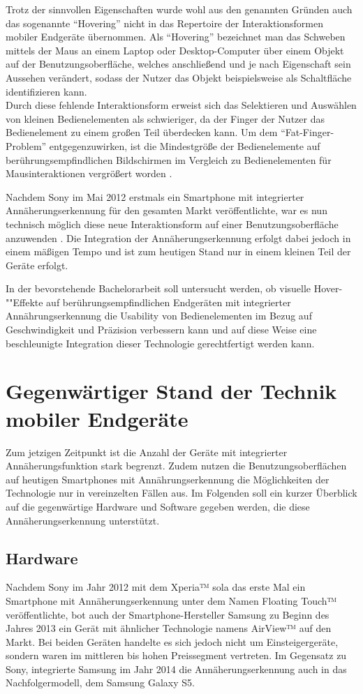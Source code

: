 \documentclass[a4paper,12pt,bibliography=totoc]{scrreprt}%
\begin{document}
Trotz der sinnvollen Eigenschaften wurde wohl aus den genannten Gründen auch das sogenannte "`Hovering"' nicht in das Repertoire der Interaktionsformen mobiler Endgeräte übernommen.
Als "`Hovering"' bezeichnet man das Schweben mittels der Maus an einem Laptop oder Desktop-Computer über einem Objekt auf der Benutzungsoberfläche, welches anschließend und je nach Eigenschaft sein Aussehen verändert, sodass der Nutzer das Objekt beispielsweise als Schaltfläche identifizieren kann.\\
Durch diese fehlende Interaktionsform erweist sich das Selektieren und Auswählen von kleinen Bedienelementen als schwieriger, da der Finger der Nutzer das Bedienelement zu einem großen Teil überdecken kann. Um dem "`Fat-Finger-Problem"' \cite{monkeys} entgegenzuwirken, ist die Mindestgröße der Bedienelemente auf berührungsempfindlichen Bildschirmen im Vergleich zu Bedienelementen für Mausinteraktionen vergrößert worden \cite{jin}.

Nachdem Sony im Mai 2012 erstmals ein Smartphone mit integrierter Annäherungserkennung für den gesamten Markt veröffentlichte, war es nun technisch möglich diese neue Interaktionsform auf einer Benutzungsoberfläche anzuwenden \cite{sonyverge}. Die Integration der Annäherungserkennung erfolgt dabei jedoch in einem mäßigen Tempo und ist zum heutigen Stand nur in einem kleinen Teil der Geräte erfolgt.

In der bevorstehende Bachelorarbeit soll untersucht werden, ob visuelle Hover-""Effekte auf berührungsempfindlichen Endgeräten mit integrierter Annährungserkennung die Usability von Bedienelementen im Bezug auf Geschwindigkeit und Präzision verbessern kann und auf diese Weise eine beschleunigte Integration dieser Technologie gerechtfertigt werden kann.

\section{Gegenwärtiger Stand der Technik mobiler Endgeräte}
Zum jetzigen Zeitpunkt ist die Anzahl der Geräte mit integrierter Annäherungsfunktion stark begrenzt. Zudem nutzen die Benutzungsoberflächen auf heutigen Smartphones mit Annährungserkennung die Möglichkeiten der Technologie nur in vereinzelten Fällen aus. Im Folgenden soll ein kurzer Überblick auf die gegenwärtige Hardware und Software gegeben werden, die diese Annäherungserkennung unterstützt.

\subsection{Hardware}
Nachdem Sony im Jahr 2012 mit dem Xperia™ sola das erste Mal ein Smartphone mit Annäherungserkennung unter dem Namen Floating Touch™  veröffentlichte, bot auch der Smartphone-Hersteller Samsung zu Beginn des Jahres 2013 ein Gerät mit ähnlicher Technologie namens AirView™ auf den Markt. Bei beiden Geräten handelte es sich jedoch nicht um Einsteigergeräte, sondern waren im mittleren bis hohen Preissegment vertreten. Im Gegensatz zu Sony, integrierte Samsung im Jahr 2014 die Annäherungserkennung auch in das Nachfolgermodell, dem Samsung Galaxy S5.
\end{document}
